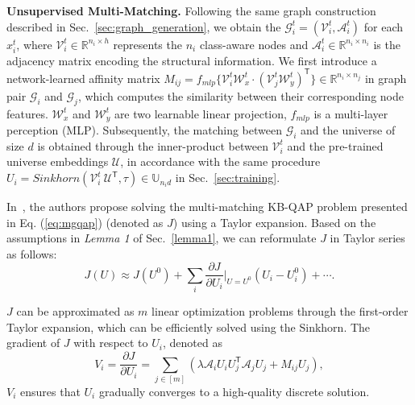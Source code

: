 \noindent \textbf{Unsupervised Multi-Matching.} Following the same graph construction described in Sec.~\ref{sec:graph_generation}, we obtain the $\mathcal{G}_i^t = (\mathcal{V}_i^t, \mathcal{A}_i^t)$ for each $x_i^t$, where $\mathcal{V}_i^t \in \mathbb{R}^{n_i\times h}$ represents the $n_i$ class-aware nodes and $\mathcal{A}_i^t \in \mathbb{R}^{n_i\times n_i}$ is the adjacency matrix encoding the structural information. 
We first introduce a network-learned affinity matrix $M_{ij} = f_{mlp}\{\mathcal{V}_i^t \mathcal{W}_{x}^t\cdot(\mathcal{V}_j^t \mathcal{W}_{y}^t)^{\mathsf{T}}\} \in \mathbb{R}^{n_i\times n_j}$ in graph pair $\mathcal{G}_i$ and $\mathcal{G}_j$, which computes the similarity between their corresponding node features. $\mathcal{W}_{x}^t$ and $\mathcal{W}_{y}^t$ are two learnable linear projection, $f_{mlp}$ is a multi-layer perception (MLP). Subsequently, the matching between $\mathcal{G}_i$ and the universe of size $d$ is obtained through the inner-product between $\mathcal{V}_i^t$ and the pre-trained universe embeddings $\mathcal{U}$, in accordance with the same procedure $U_i = Sinkhorn(\mathcal{V}_i^t \ \mathcal{U}^{\mathsf{T}}, \tau) \in \mathbb{U}_{n_i d}$ in Sec.~\ref{sec:training}.

In~\cite{wang2020graduated,wang2023unsupervised}, the authors propose solving the multi-matching KB-QAP problem presented in Eq. (\ref{eq:mgqap}) (denoted as $J$) using a Taylor expansion. Based on the assumptions in \textit{Lemma 1} of Sec.~\ref{lemma1}, we can reformulate $J$ in Taylor series as follows:
\vspace{-5pt}
\begin{equation}
    J(U) \approx J(U^0) + \sum_i \frac{\partial J}{\partial U_i} \bigg|_{U=U^0} (U_i-U_i^0) + \cdots.
\end{equation}

$J$ can be approximated as $m$ linear optimization problems through the first-order Taylor expansion, which can be efficiently solved using the Sinkhorn. The gradient of $J$ with respect to $U_i$, denoted as
\vspace{-5pt}
\begin{equation}
\label{eq:v}
    V_i = \frac{\partial J}{\partial U_i} = \sum_{j\in [m]} (\lambda \mathcal{A}_i U_i U_j^{\mathsf{T}} \mathcal{A}_j U_j + M_{ij} U_j),
\end{equation}
$V_i$ ensures that $U_i$ gradually converges to a high-quality discrete solution.

